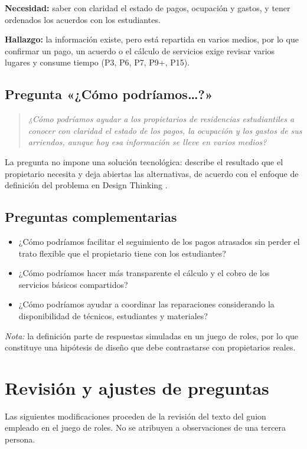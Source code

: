 \documentclass[12pt,a4paper]{article}
\begin{document}
\textbf{Necesidad:} saber con claridad el estado de pagos, ocupación y gastos, y tener ordenados los acuerdos con los estudiantes.

\textbf{Hallazgo:} la información existe, pero está repartida en varios medios, por lo que confirmar un pago, un acuerdo o el cálculo de servicios exige revisar varios lugares y consume tiempo (P3, P6, P7, P9+, P15).

\subsection{Pregunta «¿Cómo podríamos\ldots?»}
\begin{quote}\itshape\color{azul}
¿Cómo podríamos ayudar a los propietarios de residencias estudiantiles a conocer con claridad el estado de los pagos, la ocupación y los gastos de sus arriendos, aunque hoy esa información se lleve en varios medios?
\end{quote}
La pregunta no impone una solución tecnológica: describe el resultado que el propietario necesita y deja abiertas las alternativas, de acuerdo con el enfoque de definición del problema en Design Thinking \cite{stanford}.

\subsection{Preguntas complementarias}
\begin{itemize}[itemsep=3pt,topsep=3pt]
\item ¿Cómo podríamos facilitar el seguimiento de los pagos atrasados sin perder el trato flexible que el propietario tiene con los estudiantes?
\item ¿Cómo podríamos hacer más transparente el cálculo y el cobro de los servicios básicos compartidos?
\item ¿Cómo podríamos ayudar a coordinar las reparaciones considerando la disponibilidad de técnicos, estudiantes y materiales?
\end{itemize}

\textit{Nota:} la definición parte de respuestas simuladas en un juego de roles, por lo que constituye una hipótesis de diseño que debe contrastarse con propietarios reales.

\section{Revisión y ajustes de preguntas}
Las siguientes modificaciones proceden de la revisión del texto del guion empleado en el juego de roles. No se atribuyen a observaciones de una tercera persona.
\end{document}
